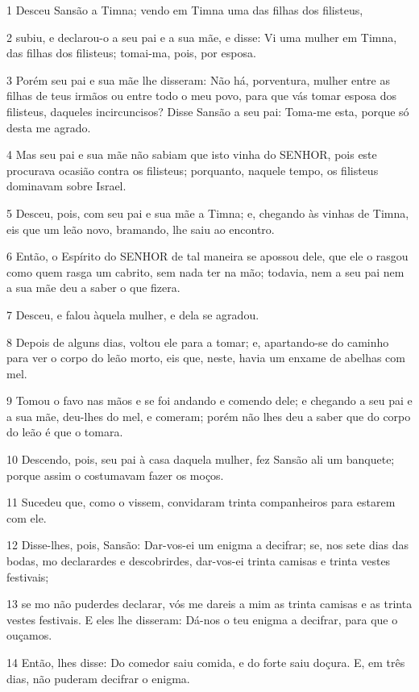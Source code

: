 \par 1 Desceu Sansão a Timna; vendo em Timna uma das filhas dos filisteus,
\par 2 subiu, e declarou-o a seu pai e a sua mãe, e disse: Vi uma mulher em Timna, das filhas dos filisteus; tomai-ma, pois, por esposa.
\par 3 Porém seu pai e sua mãe lhe disseram: Não há, porventura, mulher entre as filhas de teus irmãos ou entre todo o meu povo, para que vás tomar esposa dos filisteus, daqueles incircuncisos? Disse Sansão a seu pai: Toma-me esta, porque só desta me agrado.
\par 4 Mas seu pai e sua mãe não sabiam que isto vinha do SENHOR, pois este procurava ocasião contra os filisteus; porquanto, naquele tempo, os filisteus dominavam sobre Israel.
\par 5 Desceu, pois, com seu pai e sua mãe a Timna; e, chegando às vinhas de Timna, eis que um leão novo, bramando, lhe saiu ao encontro.
\par 6 Então, o Espírito do SENHOR de tal maneira se apossou dele, que ele o rasgou como quem rasga um cabrito, sem nada ter na mão; todavia, nem a seu pai nem a sua mãe deu a saber o que fizera.
\par 7 Desceu, e falou àquela mulher, e dela se agradou.
\par 8 Depois de alguns dias, voltou ele para a tomar; e, apartando-se do caminho para ver o corpo do leão morto, eis que, neste, havia um enxame de abelhas com mel.
\par 9 Tomou o favo nas mãos e se foi andando e comendo dele; e chegando a seu pai e a sua mãe, deu-lhes do mel, e comeram; porém não lhes deu a saber que do corpo do leão é que o tomara.
\par 10 Descendo, pois, seu pai à casa daquela mulher, fez Sansão ali um banquete; porque assim o costumavam fazer os moços.
\par 11 Sucedeu que, como o vissem, convidaram trinta companheiros para estarem com ele.
\par 12 Disse-lhes, pois, Sansão: Dar-vos-ei um enigma a decifrar; se, nos sete dias das bodas, mo declarardes e descobrirdes, dar-vos-ei trinta camisas e trinta vestes festivais;
\par 13 se mo não puderdes declarar, vós me dareis a mim as trinta camisas e as trinta vestes festivais. E eles lhe disseram: Dá-nos o teu enigma a decifrar, para que o ouçamos.
\par 14 Então, lhes disse: Do comedor saiu comida, e do forte saiu doçura. E, em três dias, não puderam decifrar o enigma.
